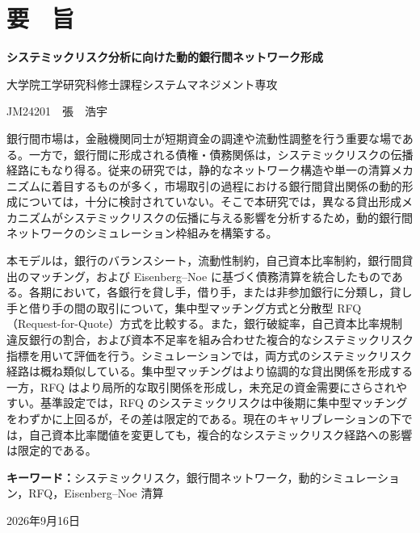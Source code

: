 \clearpage
{}
\setcounter{page}{1}
\chapter*{要　旨}
\begin{center}
{\large\bfseries システミックリスク分析に向けた動的銀行間ネットワーク形成\par}
\vspace{0.4em}
大学院工学研究科修士課程\quad システムマネジメント専攻\par
JM24201　張　浩宇
\end{center}
\vspace{0.8em}
\begin{japaneseabstract}
銀行間市場は，金融機関同士が短期資金の調達や流動性調整を行う重要な場である。一方で，銀行間に形成される債権・債務関係は，システミックリスクの伝播経路にもなり得る。従来の研究では，静的なネットワーク構造や単一の清算メカニズムに着目するものが多く，市場取引の過程における銀行間貸出関係の動的形成については，十分に検討されていない。そこで本研究では，異なる貸出形成メカニズムがシステミックリスクの伝播に与える影響を分析するため，動的銀行間ネットワークのシミュレーション枠組みを構築する。

本モデルは，銀行のバランスシート，流動性制約，自己資本比率制約，銀行間貸出のマッチング，および \mbox{Eisenberg--Noe} に基づく債務清算を統合したものである。各期において，各銀行を貸し手，借り手，または非参加銀行に分類し，貸し手と借り手の間の取引について，集中型マッチング方式と分散型 RFQ（Request-for-Quote）方式を比較する。また，銀行破綻率，自己資本比率規制違反銀行の割合，および資本不足率を組み合わせた複合的なシステミックリスク指標を用いて評価を行う。シミュレーションでは，両方式のシステミックリスク経路は概ね類似している。集中型マッチングはより協調的な貸出関係を形成する一方，RFQ はより局所的な取引関係を形成し，未充足の資金需要にさらされやすい。基準設定では，RFQ のシステミックリスクは中後期に集中型マッチングをわずかに上回るが，その差は限定的である。現在のキャリブレーションの下では，自己資本比率閾値を変更しても，複合的なシステミックリスク経路への影響は限定的である。
\end{japaneseabstract}
\vspace{0.7em}
\noindent\textbf{キーワード：}システミックリスク，銀行間ネットワーク，動的シミュレーション，RFQ，\mbox{Eisenberg--Noe} 清算
\vfill
\begin{flushright}2026年9月16日\end{flushright}


